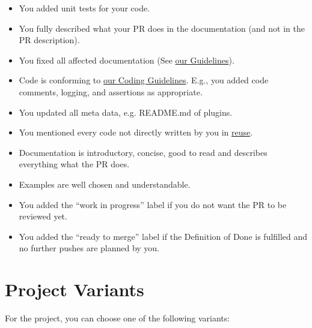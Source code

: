 \documentclass[11pt,a4paper]{article}
\begin{document}
\begin{itemize}
\item You added unit tests for your code.
\item You fully described what your PR does in the documentation
	(and not in the PR description).
\item You fixed all affected documentation (See \href{https://master.libelektra.org/doc/contrib/documentation.md}{our Guidelines}).
\item Code is conforming to \href{https://master.libelektra.org/doc/CODING.md}{our Coding Guidelines}.
	E.g., you added code comments, logging, and assertions as appropriate.
\item You updated all meta data, e.g. README.md of plugins.
\item You mentioned every code not directly written by you in \href{https://reuse.software}{reuse}.

\item Documentation is introductory, concise, good to read and describes everything what the PR does.
\item Examples are well chosen and understandable.

\item You added the ``work in progress'' label if you do not want the PR to be reviewed yet.
\item You added the ``ready to merge'' label if the Definition of Done is fulfilled and no further pushes are planned by you.
\end{itemize}




\section{Project Variants}

For the project, you can choose one of the following variants:
\end{document}
